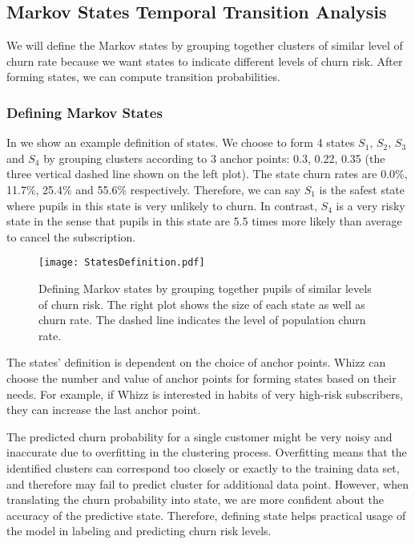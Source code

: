 \subsection{Markov States Temporal Transition Analysis}

We will define the Markov states by grouping together clusters of similar level of churn rate because we want states to indicate different levels of churn risk. After forming states, we can compute transition probabilities.

\subsubsection{Defining Markov States}

In  we show an example definition of states. We choose to form 4 states $S_1$, $S_2$, $S_3$ and $S_4$ by grouping clusters according to 3 anchor points: 0.3, 0.22, 0.35 (the three vertical dashed line shown on the left plot). The state churn rates are 0.0\%, 11.7\%, 25.4\% and 55.6\% respectively. Therefore, we can say $S_1$ is the safest state where pupils in this state is very unlikely to churn. In contrast, $S_4$ is a very risky state in the sense that pupils in this state are 5.5 times more likely than average to cancel the subscription.

\begin{figure}[!h]
\centering
\texttt{[image: StatesDefinition.pdf]}
\caption{Defining Markov states by grouping together pupils of similar levels of churn risk. The right plot shows the size of each state as well as churn rate. The dashed line indicates the level of population churn rate.}
\label{fig:statesDefinition}
\end{figure}

The states' definition is dependent on the choice of anchor points. Whizz can choose the number and value of anchor points for forming states based on their needs. For example, if Whizz is interested in habits of very high-risk subscribers, they can increase the last anchor point.

The predicted churn probability for a single customer might be very noisy and inaccurate due to overfitting in the clustering process. Overfitting means that the identified clusters can correspond too closely or exactly to the training data set, and therefore may fail to predict cluster for additional data point. However, when translating the churn probability into state, we are more confident about the accuracy of the predictive state. Therefore, defining state helps practical usage of the model in labeling and predicting churn risk levels.

